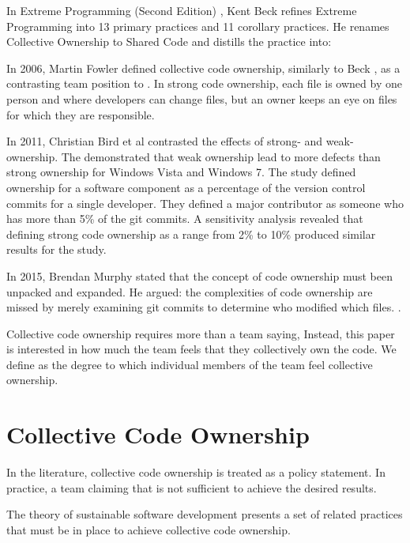 In Extreme Programming (Second Edition) \cite{ExtremeProgramming2004}, Kent Beck refines Extreme Programming into 13 primary practices and 11 corollary practices. He renames Collective Ownership to Shared Code and distills the practice into:  

In 2006, Martin Fowler defined collective code ownership, similarly to Beck \cite{FowlerCodeOwnership}, as a contrasting team position to . In strong code ownership, each file is owned by one person and  where developers can change files, but an owner keeps an eye on files for which they are responsible. 

In 2011, Christian Bird et al \cite{BirdDontTouchMyCode} contrasted the effects of strong- and weak-ownership. The demonstrated that weak ownership lead to more defects than strong ownership for Windows Vista and Windows 7. The study defined ownership for a software component as a percentage of the version control commits for a single developer. They defined a major contributor as someone who has more than 5\% of the git commits. A sensitivity analysis revealed that defining strong code ownership as a range from 2\% to 10\% produced similar results for the study.

In 2015, Brendan Murphy stated that the concept of code ownership must been unpacked and expanded. He argued: the complexities of code ownership are missed by merely examining git commits to determine who modified which files. \cite{MurphyIEEESoftware}.

Collective code ownership requires more than a team saying,  Instead, this paper is interested in how much the team feels that they collectively own the code. We define  as the degree to which individual members of the team feel collective ownership.  


\section{Collective Code Ownership}
\label{CollectiveCodeOwnership}

In the literature, collective code ownership is treated as a policy statement. In practice, a team claiming that  is not sufficient to achieve the desired results. 

The theory of sustainable software development presents a set of related practices that must be in place to achieve collective code ownership. 


